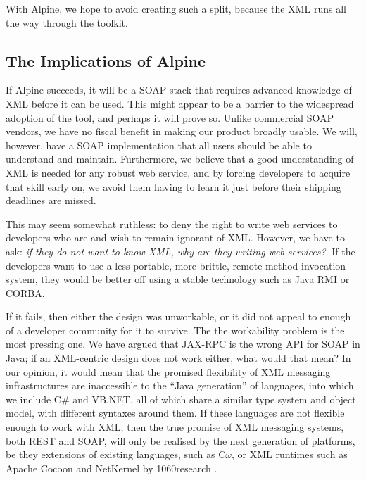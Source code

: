 With Alpine, we hope to avoid creating such a split, because the XML runs all
the way through the toolkit. 

\subsection{The Implications of Alpine}
\label{alpine:implications}

If Alpine succeeds, it will be a SOAP stack that requires advanced
knowledge of XML before it can be used. This might appear to be a
barrier to the widespread adoption of the tool, and perhaps it will
prove so. Unlike commercial SOAP vendors, we have no fiscal benefit in
making our product broadly usable. We will, however, have a SOAP
implementation that all users should be able to understand and
maintain.  Furthermore, we believe that a good understanding of XML is
needed for any robust web service, and by forcing developers to
acquire that skill early on, we avoid them having to learn it just
before their shipping deadlines are missed.

This may seem somewhat ruthless: to deny the right to write web
services to developers who are and wish to remain ignorant of XML.
However, we have to ask: \emph{if they do not want to know XML, why are
they writing web services?}. If the developers want to use a less portable,
more brittle, remote method invocation system, they would be better off
using a stable technology such as Java RMI or CORBA.

If it fails, then either the design was unworkable, or it did not appeal
to enough of a developer community for it to survive. The the
workability problem is the most pressing one. We have argued that
JAX-RPC is the wrong API for SOAP in Java; if an XML-centric design does
not work either, what would that mean? In our opinion, it would mean
that the promised flexibility of XML messaging infrastructures are inaccessible
to the ``Java generation'' of languages, into which we include C\# and VB.NET, all of
which share a similar type system and object model, with different
syntaxes around them. If these languages are not flexible enough to
work with XML, then the true promise of XML messaging systems, both REST
and SOAP, will only be realised by the next generation of platforms, be
they extensions of existing languages, such as C$\omega$, or 
XML runtimes such as Apache Cocoon and NetKernel by 1060research
\cite{MSFT:TransitionsInProgrammingModels,pjr:NKonTSS}.
